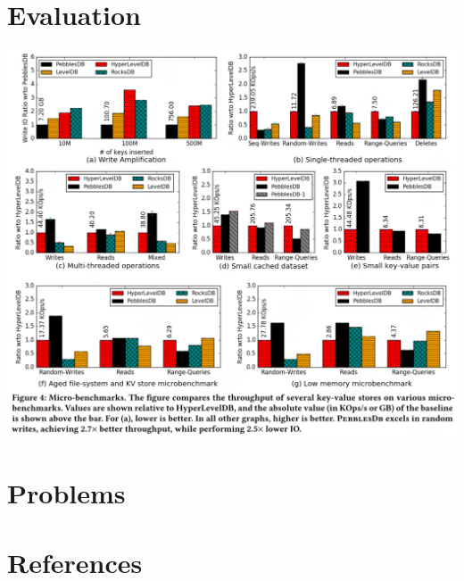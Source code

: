 \documentclass[11pt]{article}
\begin{document}
\section{Evaluation}
\label{sec:orga58ca22}
\begin{center}
\includegraphics[width=.99\textwidth]{../../images/papers/122.png}
\label{}
\end{center}
\section{Problems}
\label{sec:org02853fc}


\section{References}
\label{sec:org81c93bf}
\label{bibliographystyle link}



\end{document}
